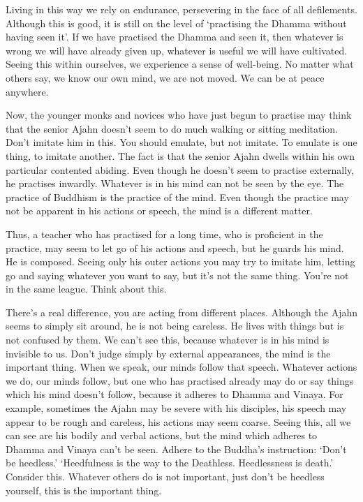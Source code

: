 Living in this way we rely on endurance, persevering in the face of all defilements. Although this is good, it is still on the level of `practising the Dhamma without having seen it'. If we have practised the Dhamma and seen it, then whatever is wrong we will have already given up, whatever is useful we will have cultivated. Seeing this within ourselves, we experience a sense of well-being. No matter what others say, we know our own mind, we are not moved. We can be at peace anywhere. 

Now, the younger monks and novices who have just begun to practise may think that the senior Ajahn doesn't seem to do much walking or sitting meditation. Don't imitate him in this. You should emulate, but not imitate. To emulate is one thing, to imitate another. The fact is that the senior Ajahn dwells within his own particular contented abiding. Even though he doesn't seem to practise externally, he practises inwardly. Whatever is in his mind can not be seen by the eye. The practice of Buddhism is the practice of the mind. Even though the practice may not be apparent in his actions or speech, the mind is a different matter. 

Thus, a teacher who has practised for a long time, who is proficient in the practice, may seem to let go of his actions and speech, but he guards his mind. He is composed. Seeing only his outer actions you may try to imitate him, letting go and saying whatever you want to say, but it's not the same thing. You're not in the same league. Think about this. 

There's a real difference, you are acting from different places. Although the Ajahn seems to simply sit around, he is not being careless. He lives with things but is not confused by them. We can't see this, because whatever is in his mind is invisible to us. Don't judge simply by external appearances, the mind is the important thing. When we speak, our minds follow that speech. Whatever actions we do, our minds follow, but one who has practised already may do or say things which his mind doesn't follow, because it adheres to Dhamma and Vinaya. For example, sometimes the Ajahn may be severe with his disciples, his speech may appear to be rough and careless, his actions may seem coarse. Seeing this, all we can see are his bodily and verbal actions, but the mind which adheres to Dhamma and Vinaya can't be seen. Adhere to the Buddha's instruction: `Don't be heedless.' `Heedfulness is the way to the Deathless. Heedlessness is death.' Consider this. Whatever others do is not important, just don't be heedless yourself, this is the important thing. 

